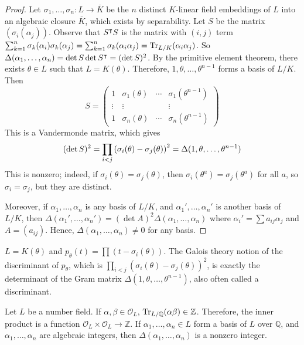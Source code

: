 \begin{proof}
    Let \( \sigma_1, \dots, \sigma_n \colon L \to \overline K \) be the \( n \) distinct \( K \)-linear field embeddings of \( L \) into an algebraic closure \( \overline K \), which exists by separability.
    Let \( S \) be the matrix \( (\sigma_i(\alpha_j)) \).
    Observe that \( S^\intercal S \) is the matrix with \( (i,j) \) term \( \sum_{k=1}^n \sigma_k(\alpha_i) \sigma_k(\alpha_j) = \sum_{k=1}^n \sigma_k(\alpha_i \alpha_j) = \Tr_{L/K}(\alpha_i \alpha_j) \).
    So \( \Delta(\alpha_1, \dots, \alpha_n) = \det S \det S^\intercal = (\det S)^2 \).
    By the primitive element theorem, there exists \( \theta \in L \) such that \( L = K(\theta) \).
    Therefore, \( 1, \theta, \dots, \theta^{n-1} \) forms a basis of \( L / K \).
    Then
    \[ S = \begin{pmatrix}
        1 & \sigma_1(\theta) & \cdots & \sigma_1(\theta^{n-1}) \\
        \vdots & \vdots & & \vdots \\
        1 & \sigma_n(\theta) & \cdots & \sigma_n(\theta^{n-1})
    \end{pmatrix} \]
    This is a Vandermonde matrix, which gives
    \[ (\det S)^2 = \prod_{i < j} \qty(\sigma_i(\theta) - \sigma_j(\theta))^2 = \Delta(1, \theta, \dots, \theta^{n-1}) \]
    This is nonzero; indeed, if \( \sigma_i(\theta) = \sigma_j(\theta) \), then \( \sigma_i(\theta^a) = \sigma_j(\theta^a) \) for all \( a \), so \( \sigma_i = \sigma_j \), but they are distinct.

    Moreover, if \( \alpha_1, \dots, \alpha_n \) is any basis of \( L / K \), and \( \alpha_1', \dots, \alpha_n' \) is another basis of \( L / K \), then \( \Delta(\alpha_1', \dots, \alpha_n') = (\det A)^2 \Delta(\alpha_1, \dots, \alpha_n) \) where \( \alpha_i' = \sum a_{ij} \alpha_j \) and \( A = (a_{ij}) \).
    Hence, \( \Delta(\alpha_1, \dots, \alpha_n) \neq 0 \) for any basis.
\end{proof}
\begin{remark}
    \( L = K(\theta) \) and \( p_\theta(t) = \prod (t-\sigma_i(\theta)) \).
    The Galois theory notion of the discriminant of \( p_\theta \), which is \( \prod_{i < j} (\sigma_i(\theta) - \sigma_j(\theta))^2 \), is exactly the determinant of the Gram matrix \( \Delta(1, \theta, \dots, \theta^{n-1}) \), also often called a discriminant.
\end{remark}
\begin{remark}
    Let \( L \) be a number field.
    If \( \alpha, \beta \in \mathcal O_L \), \( \Tr_{L/\mathbb Q}(\alpha\beta) \in \mathbb Z \).
    Therefore, the inner product is a function \( \mathcal O_L \times \mathcal O_L \to \mathbb Z \).
    If \( \alpha_1, \dots, \alpha_n \in L \) form a basis of \( L \) over \( \mathbb Q \), and \( \alpha_1, \dots, \alpha_n \) are algebraic integers, then \( \Delta(\alpha_1, \dots, \alpha_n) \) is a nonzero integer.
\end{remark}
